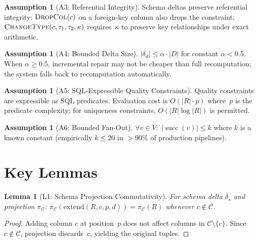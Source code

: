 \documentclass[11pt,a4paper]{article}
\newtheorem{lemma}[theorem]{Lemma}
\theoremstyle{definition}
\newtheorem{assumption}[theorem]{Assumption}
\DeclareMathOperator{\succ}{succ}
\begin{document}
\begin{assumption}[A3: Referential Integrity]\label{asm:ref-integrity}
Schema deltas preserve referential integrity: $\textsc{DropCol}(c)$ on a
foreign-key column also drops the constraint;
$\textsc{ChangeType}(c, \tau_1, \tau_2, \kappa)$ requires~$\kappa$ to
preserve key relationships under exact arithmetic.
\end{assumption}

\begin{assumption}[A4: Bounded Delta Size]\label{asm:bounded-delta}
$|\delta_d| \leq \alpha \cdot |D|$ for constant $\alpha < 0.5$.
When $\alpha \geq 0.5$, incremental repair may not be cheaper than full
recomputation; the system falls back to recomputation automatically.
\end{assumption}

\begin{assumption}[A5: SQL-Expressible Quality Constraints]\label{asm:sql-quality}
Quality constraints are expressible as SQL predicates.
Evaluation cost is $O(|R| \cdot p)$ where~$p$ is the predicate complexity;
for uniqueness constraints, $O(|R| \log |R|)$ is permitted.
\end{assumption}

\begin{assumption}[A6: Bounded Fan-Out]\label{asm:bounded-fanout}
$\forall v \in V:\; |\succ(v)| \leq k$ where $k$ is a known constant
(empirically $k \leq 20$ in $>$90\% of production pipelines).
\end{assumption}


\section{Key Lemmas}
\label{sec:lemmas}

\begin{lemma}[L1: Schema Projection Commutativity]\label{lem:proj-commute}
For schema delta $\delta_s$ and projection $\pi_{\mathcal{C}}$:
$\pi_{\mathcal{C}}(\mathrm{extend}(R, c, p, d)) = \pi_{\mathcal{C}}(R)$
whenever $c \notin \mathcal{C}$.
\end{lemma}
\begin{proof}
Adding column $c$ at position~$p$ does not affect columns in
$\mathcal{C} \setminus \{c\}$.  Since $c \notin \mathcal{C}$, projection
discards~$c$, yielding the original tuples.
\end{proof}
\end{document}
